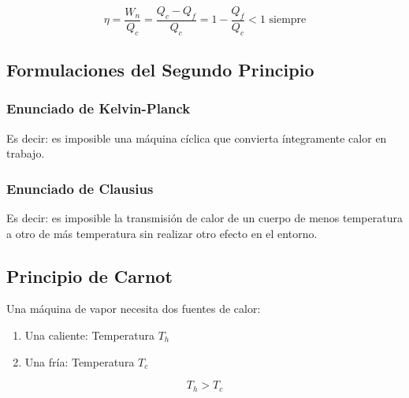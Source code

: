         \begin{equation}
        \label{ef_biterma}
            \eta=\frac{W_{n}}{Q_{c}}=\frac{Q_{c}-Q_{f}}{Q_{c}}=1-\frac{Q_{f}}{Q_{c}}<1\text{ siempre}
        \end{equation}
    
    \subsection{Formulaciones del Segundo Principio}
    
        \subsubsection{Enunciado de Kelvin-Planck}
        
        \begin{quote}
            \textit{}
        \end{quote}
        
        Es decir: es imposible una máquina cíclica que convierta íntegramente calor en trabajo.
        
        \subsubsection{Enunciado de Clausius}
        
        \begin{quote}
            \textit{}
        \end{quote}
        
        Es decir: es imposible la transmisión de calor de un cuerpo de menos temperatura a otro de más temperatura sin realizar otro efecto en el entorno.
        
    \subsection{Principio de Carnot}
    
    Una máquina de vapor necesita dos fuentes de calor:
    
    \begin{enumerate}
        \item Una caliente: Temperatura \(T_{h}\)
        \item Una fría: Temperatura \(T_{c}\)
    \end{enumerate}
    \[T_{h}>T_{c}\]
    
